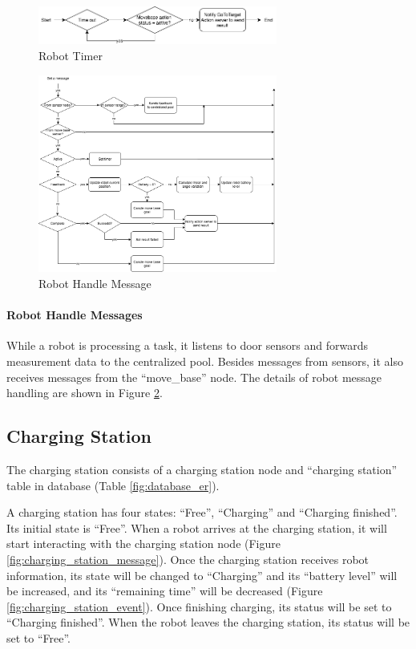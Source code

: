 \begin{figure}
 \centering
 \includegraphics[width = 0.7\textwidth]{content/images/ch4/robot_timer.drawio.png}
 \caption{Robot Timer}
 \label{fig:robot_timer}
\end{figure}

\begin{figure}
 \centering
 \includegraphics[width = 0.7\textwidth]{content/images/ch4/robot_message.drawio.png}
 \caption{Robot Handle Message}
 \label{fig:robot_handle_message}
\end{figure}

\paragraph{Robot Handle Messages}
While a robot is processing a task, it listens to door sensors and forwards measurement data to the centralized pool. 
Besides messages from sensors, it also receives messages from the ``move\_base'' node. The details of robot message handling are shown in Figure \ref{fig:robot_handle_message}.

\subsection{Charging Station}
\label{sec:charging_station}
The charging station consists of a charging station node and ``charging station'' table in database (Table \ref{fig:database_er}). 

A charging station has four states: ``Free'', ``Charging'' and ``Charging finished''. Its initial state is ``Free''. When a robot arrives at the charging station, it will start interacting with the charging station node (Figure \ref{fig:charging_station_message}). 
Once the charging station receives robot information, its state will be changed to ``Charging'' and its ``battery level'' will be increased, and its ``remaining time'' will be decreased (Figure \ref{fig:charging_station_event}). 
Once finishing charging, its status will be set to ``Charging finished''. When the robot leaves the charging station, its status will be set to ``Free''. 

